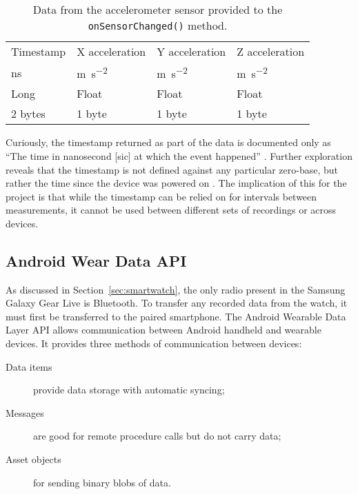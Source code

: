       \begin{table}
        \tabcolsep=0.11cm
        \centering
        \begin{tabu} to \linewidth {|X[2,c] | X[c] | X[c] | X[c] |}
          \hline
          Timestamp & X acceleration & Y acceleration & Z acceleration \\
          \si{ns} & \si{\metre\per\square\second} & \si{\metre\per\square\second} & \si{\metre\per\square\second} \\
          Long & Float & Float & Float \\
          2 bytes & 1 byte & 1 byte & 1 byte \\
          \hline
        \end{tabu}
        \caption[Data from the accelerometer sensor]{Data from the accelerometer sensor provided to the \texttt{onSensorChanged()} 
            method.}
        \label{tab:data-row}
      \end{table}
      
      Curiously, the timestamp returned as part of the data is documented only as ``The time in nanosecond [sic] at which the event happened'' \cite{androidsensoreventapi}. Further exploration reveals that the timestamp is not defined against any particular zero-base, but rather the time since the device was powered on \cite{androidissuedocumentationbug, androidissuehardwarebug}. The implication of this for the project is that while the timestamp can be relied on for intervals between measurements, it cannot be used between different sets of recordings or across devices.
      

    \subsection{Android Wear Data API}
      \label{sec:prep-data-api}
      As discussed in Section~\ref{sec:smartwatch}, the only radio present in the Samsung Galaxy 
      Gear Live is Bluetooth. To transfer any recorded data from the watch, it must first be transferred to the paired smartphone. 
      The Android Wearable Data Layer API allows communication between Android handheld and wearable
      devices. It provides three methods of communication between devices:
      \begin{description}
        \item[Data items] provide data storage with automatic syncing;
        \item[Messages] are good for remote procedure calls but do not carry data;
        \item[Asset objects] for sending binary blobs of data.
      \end{description}
      

